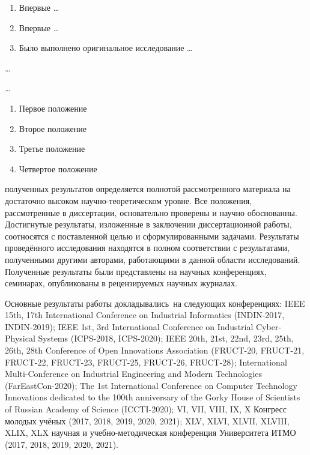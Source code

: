 {\novelty}
\begin{enumerate}[beginpenalty=10000] %
  \item Впервые \ldots
  \item Впервые \ldots
  \item Было выполнено оригинальное исследование \ldots
\end{enumerate}

{\influence} \ldots

{\methods} \ldots

{}
\begin{enumerate}[beginpenalty=10000] %
  \item Первое положение
  \item Второе положение
  \item Третье положение
  \item Четвертое положение
\end{enumerate}

{\reliability} полученных результатов определяется полнотой рассмотренного материала на достаточно высоком научно-теоретическом уровне. Все положения,  рассмотренные в диссертации, основательно проверены и научно обоснованны. Достигнутые результаты, изложенные в заключении диссертационной работы, соотносятся с поставленной целью и сформулированными задачами. Результаты проведённого исследования находятся в полном соответствии с результатами, полученными другими авторами, работающими в данной области исследований. Полученные результаты были представлены на научных конференциях, семинарах, опубликованы в рецензируемых научных журналах.


{\probation}
Основные результаты работы докладывались~на следующих конференциях: IEEE 15th, 17th International Conference on Industrial Informatics (INDIN-2017, INDIN-2019); IEEE 1st, 3rd International Conference on Industrial Cyber-Physical Systems (ICPS-2018, ICPS-2020); IEEE 20th, 21st, 22nd, 23rd, 25th, 26th, 28th Conference of Open Innovations Association (FRUCT-20, FRUCT-21, FRUCT-22, FRUCT-23, FRUCT-25, FRUCT-26, FRUCT-28); International Multi-Conference on Industrial Engineering and Modern Technologies (FarEastCon-2020); The 1st International Conference on Computer Technology Innovations dedicated to the 100th anniversary of the Gorky House of Scientists of Russian Academy of Science (ICCTI-2020); VI, VII, VIII, IX, X  Конгресс молодых учёных (2017, 2018, 2019, 2020, 2021); XLV, XLVI, XLVII, XLVIII, XLIX, XLX  научная и учебно-методическая конференция Университета \mbox{ИТМО} (2017, 2018, 2019, 2020, 2021).

